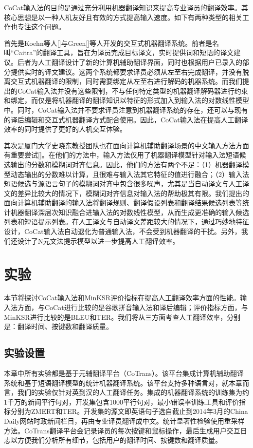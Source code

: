 CoCat输入法的目的是通过充分利用机器翻译知识来提高专业译员的翻译效率。其核心思想是以一种人机友好且有效的方式提高输入速度。如下有两种类型的相关工作也专注这个问题。

首先是Koehn等人[\cite{Koehn:2009a,Koehn:2014}]与Green[\cite{Green:2014}]等人开发的交互式机器翻译系统。前者是名叫“Caitra”的翻译工具，旨在为译员完成目标译文，实时提供词和短语的译文建议。后者为人工翻译设计了新的计算机辅助翻译界面，同时也根据用户已录入的部分提供实时的译文建议。这两个系统都要求译员必须从左至右完成翻译，并没有脱离交互式机器翻译的限制，同时需要绑定从左至右进行解码的机器系统。而我们提出的CoCat输入法并没有这些限制，不与任何特定类型的机器翻译解码器进行约束和绑定，而仅是将机器翻译的翻译知识以特征的形式加入到输入法的对数线性模型中。同时，CoCat输入法并不要求译员注意到机器翻译系统的存在，还可以与现有的译后编辑和交互式机器翻译方式配合使用。因此，CoCat输入法在提高人工翻译效率的同时提供了更好的人机交互体验。

其次是厦门大学史晓东教授团队也在面向计算机辅助翻译场景的中文输入方法方面有重要尝试[\cite{lidong:2006,LiDong:2012,fang:2013}]。在他们的方法中，输入方法仅用了机器翻译模型针对输入法短语候选输出的分数和模糊词对齐信息。因此，他们的方法有两个不足：（1）机器翻译模型动态输出的分数难以计算，且很难与输入法其它特征的值进行融合；（2）输入法短语候选与源语言句子的模糊词对齐中包含很多噪声，尤其是当自动译文与人工译文的差异比较大的情况下，模糊词对齐信息对输入法的帮助极其有限。我们提出的面向计算机辅助翻译的输入法将翻译规则、翻译假设列表和翻译结果候选列表等统计机器翻译深层次知识融合进输入法的对数线性模型，从而生成更准确的输入候选列表和短语提示列表。在人工译文与自动译文差距较大的情况下，通过巧妙地特征设计，CoCat输入法自动退化为普通输入法，不会受到机器翻译的干扰。另外，我们还设计了N元文法提示模型以进一步提高人工翻译效率。

\section{实验}

本节将探讨CoCat输入法和MinKSR评价指标在提高人工翻译效率方面的性能。输入法方面，与CoCat进行比较的是谷歌拼音输入法和译后编辑；评价指标方面，与MinKSR进行比较的是BLEU和TER。我们将从三方面考查人工翻译效率，分别是：翻译时间、按键数和翻译质量。

\subsection{实验设置}

本章中所有实验都是基于元辅翻译平台（CoTrans）。该平台集成计算机辅助翻译系统和基于短语翻译模型的统计机器翻译系统。该平台支持多种语言对，就本章而言，我们的实验仅针对英到汉的人工翻译任务。集成的机器翻译系统的训练集为约1千万的新闻平行句对，开发集包含1000平行句对，最小错误率训练工具和评价指标分别为ZMERT和TER。开发集的源文即英语句子选自截止到2014年3月的China Daily网站时政新闻栏目，再由专业译员翻译成中文。统计显著性检验使用重采样方法。CoTrans翻译平台会记录译员的每次按键和鼠标操作，最后生成用户交互日志以方便我们分析所有细节，包括用户的翻译时间、按键数和翻译质量。

